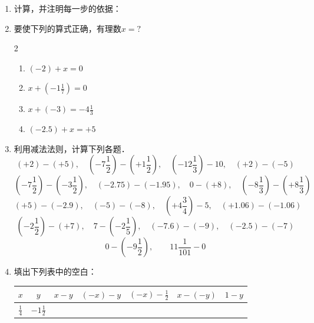 \begin{enumerate}
\item 计算，并注明每一步的依据：
\begin{enumerate}
\end{enumerate}
\item 要使下列的算式正确，有理数$x=?$
\begin{multicols}{2}
\begin{enumerate}
    \item $(-2)+x=0$
    \item $x+\left(-1\frac{1}{7}\right)=0$
    \item $x+(-3)=-4\frac{1}{3}$
    \item $(-2.5)+x=+5$
\end{enumerate}
\end{multicols}
\item 利用减法法则，计算下列各题．
\[(+2)-(+5),\quad \left(-7\frac{1}{2}\right)-\left(+1\frac{1}{2}\right),\quad \left(-12\frac{1}{3}\right)-10,\quad (+2)-(-5)\]
\[\left(-7\frac{1}{2}\right)-\left(-3\frac{1}{2}\right),\quad (-2.75)-(-1.95),\quad 0-(+8),\quad \left(-8\frac{1}{3}\right)-\left(+8\frac{1}{3}\right)\]
\[(+5)-(-2.9), \quad (-5)-(-8),\quad \left(+4\frac{3}{4}\right)-5,\quad (+1.06)-(-1.06)\]
\[\left(-2\frac{1}{2}\right)-(+7),\quad 7-\left(-2\frac{1}{5}\right),\quad (-7.6)-(-9),\quad (-2.5)-(-7)\]
\[0-\left(-9\frac{1}{2}\right),\qquad 11\frac{1}{101}-0\]

\item 填出下列表中的空白：
\begin{center}
    \renewcommand{\arraystretch}{1.8}
\begin{tabular}{c|c|c|c|c|c|c}
\hline
$x$  &  $y$  &  $x-y$  &  $(-x)-y$  &  $(-x)-\frac{1}{2}$  &  $x-(-y)$  &  $1-y$\\
\hline
$\frac{1}{4}$ & $-1\frac{1}{2}$ &&&&&\\
\hline
\end{tabular}    
\end{center}


\end{enumerate}
